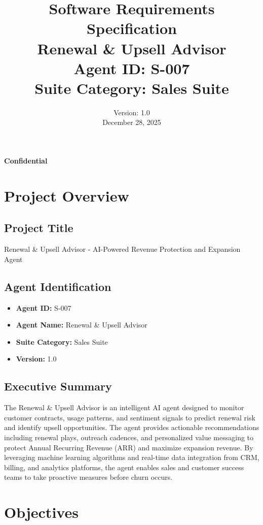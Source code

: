 \documentclass[12pt,a4paper]{article}
\title{\textbf{Software Requirements Specification}\\ \vspace{1cm} \Large Renewal \& Upsell Advisor\\ \vspace{0.5cm} \large Agent ID: S-007\\ Suite Category: Sales Suite}
\author{}
\date{Version: 1.0\\ December 28, 2025}
\begin{document}
\maketitle
\thispagestyle{empty}
\begin{center}
    \textbf{Confidential}
\end{center}

\newpage

\tableofcontents

\newpage

\section{Project Overview}

\subsection{Project Title}
Renewal \& Upsell Advisor - AI-Powered Revenue Protection and Expansion Agent

\subsection{Agent Identification}
\begin{itemize}
    \item \textbf{Agent ID:} S-007
    \item \textbf{Agent Name:} Renewal \& Upsell Advisor
    \item \textbf{Suite Category:} Sales Suite
    \item \textbf{Version:} 1.0
\end{itemize}

\subsection{Executive Summary}
The Renewal \& Upsell Advisor is an intelligent AI agent designed to monitor customer contracts, usage patterns, and sentiment signals to predict renewal risk and identify upsell opportunities. The agent provides actionable recommendations including renewal plays, outreach cadences, and personalized value messaging to protect Annual Recurring Revenue (ARR) and maximize expansion revenue. By leveraging machine learning algorithms and real-time data integration from CRM, billing, and analytics platforms, the agent enables sales and customer success teams to take proactive measures before churn occurs.

\section{Objectives}
\end{document}
